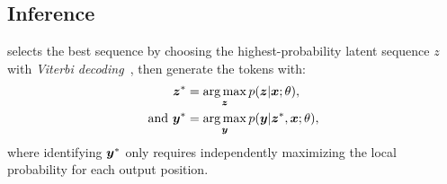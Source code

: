 \subsection{Inference} 
\method selects the best sequence by choosing the highest-probability latent sequence $z$ with \textit{Viterbi decoding}~\cite{viterbi1967error}, then generate the tokens with:
\begin{align*}
    \z^{*} &= \argmax_{\z} p(\z|\x;\theta), \\ 
    \text{and}\ \y^{*} &=\argmax_{\y}p(\y|\z^{*},\x;\theta),
\end{align*}
where identifying $\y^{*}$ only requires independently maximizing the local probability for each output position.




\documentclass[11pt]{article}

\usepackage{naacl2021}

\usepackage{times}
\usepackage{latexsym}

\usepackage[T1]{fontenc}

\usepackage[utf8]{inputenc}

\usepackage{microtype}


\usepackage{amsfonts,amsmath,bm,xspace}
\usepackage{graphicx}
\usepackage{subcaption}
\usepackage{booktabs}
\usepackage{multicol,multirow}

\DeclareMathOperator*{\argmax}{arg\,max}
\DeclareMathOperator*{\argmin}{arg\,min}

\newcommand{\softmax}{\operatorname{softmax}}
\newcommand{\x}{\bm x}
\newcommand{\y}{\bm y}
\newcommand{\z}{\bm z}
\newcommand{\h}{\bm h}
\newcommand{\Q}{\mathbf{Q}}
\newcommand{\vq}{categorical latent variable}
\newcommand{\pseudopara}[1]{\noindent\textbf{#1 }}
\newcommand{\hit}{\checkmark}
\newcommand{\method}{\textsc{CNAT}\xspace}
\newcommand{\baoy}[1]{\textcolor{red}{\bf \small [#1]}}
\newcommand{\todo}[1]{\textcolor{blue}{\bf \small [TODO: #1]}}



